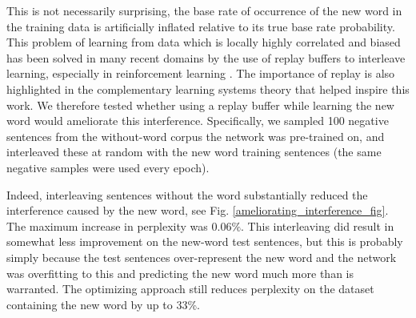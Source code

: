 \documentclass{article}
\begin{document}
This is not necessarily surprising, the base rate of occurrence of the new word in the training data is artificially inflated relative to its true base rate probability. This problem of learning from data which is locally highly correlated and biased has been solved in many recent domains by the use of replay buffers to interleave learning, especially in reinforcement learning \citep[e.g]{Mnih2015}. The importance of replay is also highlighted in the complementary learning systems theory \citep{Kumaran2016} that helped inspire this work. We therefore tested whether using a replay buffer while learning the new word would ameliorate this interference. Specifically, we sampled 100 negative sentences from the without-word corpus the network was pre-trained on, and interleaved these at random with the new word training sentences (the same negative samples were used every epoch). \par
Indeed, interleaving sentences without the word substantially reduced the interference caused by the new word, see Fig. \ref{ameliorating_interference_fig}. The maximum increase in perplexity was \(0.06\%\). This interleaving did result in somewhat less improvement on the new-word test sentences, but this is probably simply because the test sentences over-represent the new word and the network was overfitting to this and predicting the new word much more than is warranted. The optimizing approach still reduces perplexity on the dataset containing the new word by up to 33\%. \par
\end{document}
